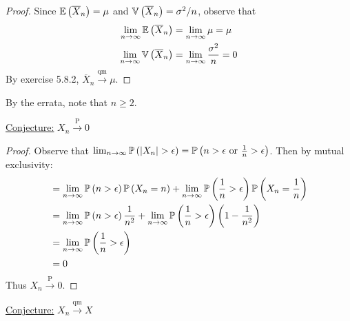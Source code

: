 \documentclass[a4paper]{article}
\begin{document}
\begin{proof}[Proof] 
Since \(\mathbb{E}\left( \overline{X}_{n} \right) = \mu \) and \(\mathbb{V}\left( \overline{X}_{n} \right) = \sigma^{2} / n\), observe that
\begin{align*}
	\lim_{n \to \infty} \mathbb{E}\left( \overline{X}_{n} \right) & = \lim_{n \to \infty} \mu = \mu  \\
	\lim_{n \to \infty} \mathbb{V}\left( \overline{X}_{n} \right) & = \lim_{n \to \infty} \frac{\sigma^{2}}{n} = 0 \\ 
\end{align*}
By exercise 5.8.2, \(\overline{X}_{n} \xrightarrow{\text{qm}} \mu \).
\end{proof}


By the errata, note that \(n \ge 2\).

\underline{Conjecture:} \(X_{n} \xrightarrow{\text{ P }} 0 \)

\begin{proof}[Proof] 
Observe that \(\lim_{n \to \infty} \Prob\left( \abs{X_{n}} > \epsilon  \right) = \Prob\left( n > \epsilon \text{ or } \frac{1}{n} > \epsilon  \right)\). Then by mutual exclusivity:
\begin{align*}
	 & = \lim_{n \to \infty} \mathbb{P}\left( n > \epsilon  \right)\mathbb{P}\left( X_{n} = n \right) + \lim_{n \to \infty} \mathbb{P}\left( \frac{1}{n} > \epsilon  \right) \mathbb{P}\left( X_{n} = \frac{1}{n} \right) \\
	 & = \lim_{n \to \infty} \mathbb{P}\left( n > \epsilon  \right) \frac{1}{n^{2}} + \lim_{n \to \infty} \mathbb{P}\left( \frac{1}{n} > \epsilon  \right) \left( 1 - \frac{1}{n^{2}} \right)  \\ 
	 & = \lim_{n \to \infty} \mathbb{P}\left( \frac{1}{n} > \epsilon  \right) \\
	 & = 0
\end{align*}
Thus \(X_{n} \xrightarrow{\text{ P }} 0\).
\end{proof}

\underline{Conjecture:} \(X_{n} \xrightarrow{\text{qm}} X\)
\end{document}

